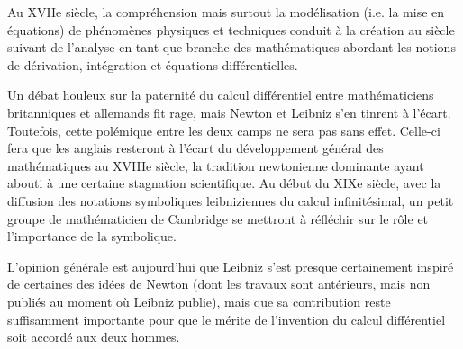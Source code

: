 \begin{histoire}%
Au XVIIe siècle, la compréhension mais surtout la modélisation (i.e. la mise en équations)
de phénomènes physiques et techniques conduit à la création au siècle suivant de
l'analyse en tant que branche des mathématiques
abordant les notions de dérivation, intégration et équations différentielles.

\ifVersionDuDocEstVincent\medskip\fi
{}

Un débat houleux sur la paternité du calcul différentiel entre mathématiciens britanniques et allemands
fit rage, mais Newton et Leibniz s'en tinrent à l'écart.
Toutefois, cette polémique entre les deux camps ne sera pas sans effet.
Celle-ci fera que les anglais resteront à l'écart du développement général des mathématiques
au XVIIIe siècle, la tradition newtonienne dominante ayant abouti à une certaine stagnation
scientifique. Au début du XIXe siècle, avec la diffusion des notations symboliques leibniziennes
du calcul infinitésimal, un petit groupe de mathématicien de Cambridge se mettront
à réfléchir sur le rôle et l'importance de la symbolique.

\ifVersionDuDocEstVincent\medskip\fi
L'opinion générale est aujourd'hui que Leibniz s'est presque
certainement inspiré de certaines des idées de Newton (dont les travaux sont antérieurs, mais non publiés au moment
où Leibniz publie), mais que sa contribution reste suffisamment importante pour que le
mérite de l'invention du calcul différentiel soit accordé aux deux hommes.


\end{histoire}

